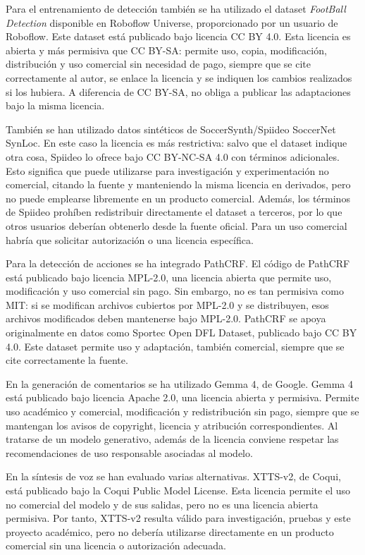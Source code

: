 Para el entrenamiento de detección también se ha utilizado el dataset \textit{FootBall Detection} disponible en Roboflow Universe, proporcionado por un usuario de Roboflow. Este dataset está publicado bajo licencia CC BY 4.0. Esta licencia es abierta y más permisiva que CC BY-SA: permite uso, copia, modificación, distribución y uso comercial sin necesidad de pago, siempre que se cite correctamente al autor, se enlace la licencia y se indiquen los cambios realizados si los hubiera. A diferencia de CC BY-SA, no obliga a publicar las adaptaciones bajo la misma licencia.

También se han utilizado datos sintéticos de SoccerSynth/Spiideo SoccerNet SynLoc. En este caso la licencia es más restrictiva: salvo que el dataset indique otra cosa, Spiideo lo ofrece bajo CC BY-NC-SA 4.0 con términos adicionales. Esto significa que puede utilizarse para investigación y experimentación no comercial, citando la fuente y manteniendo la misma licencia en derivados, pero no puede emplearse libremente en un producto comercial. Además, los términos de Spiideo prohíben redistribuir directamente el dataset a terceros, por lo que otros usuarios deberían obtenerlo desde la fuente oficial. Para un uso comercial habría que solicitar autorización o una licencia específica.

Para la detección de acciones se ha integrado PathCRF. El código de PathCRF está publicado bajo licencia MPL-2.0, una licencia abierta que permite uso, modificación y uso comercial sin pago. Sin embargo, no es tan permisiva como MIT: si se modifican archivos cubiertos por MPL-2.0 y se distribuyen, esos archivos modificados deben mantenerse bajo MPL-2.0. PathCRF se apoya originalmente en datos como Sportec Open DFL Dataset, publicado bajo CC BY 4.0. Este dataset permite uso y adaptación, también comercial, siempre que se cite correctamente la fuente.

En la generación de comentarios se ha utilizado Gemma 4, de Google. Gemma 4 está publicado bajo licencia Apache 2.0, una licencia abierta y permisiva. Permite uso académico y comercial, modificación y redistribución sin pago, siempre que se mantengan los avisos de copyright, licencia y atribución correspondientes. Al tratarse de un modelo generativo, además de la licencia conviene respetar las recomendaciones de uso responsable asociadas al modelo.

En la síntesis de voz se han evaluado varias alternativas. XTTS-v2, de Coqui, está publicado bajo la Coqui Public Model License. Esta licencia permite el uso no comercial del modelo y de sus salidas, pero no es una licencia abierta permisiva. Por tanto, XTTS-v2 resulta válido para investigación, pruebas y este proyecto académico, pero no debería utilizarse directamente en un producto comercial sin una licencia o autorización adecuada.

